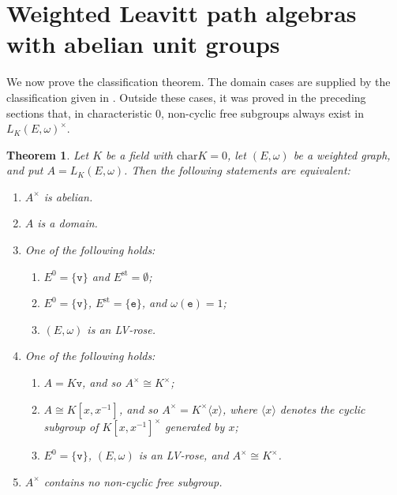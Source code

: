 \documentclass{article}
\newtheorem{theorem}{Theorem}
\theoremstyle{definition}
\begin{document}
\section{Weighted Leavitt path algebras with abelian unit groups}

We now prove the classification theorem. The domain cases are supplied by the classification given in \cite{HaP}. Outside these cases, it was proved in the preceding sections that, in characteristic $0$, non-cyclic free subgroups always exist in $L_K(E,\omega)^\times$.

\begin{theorem}\label{thm:abelian-units-and-free-subgroups}
Let $K$ be a field with $\mathrm{char} K =0 $, let $(E,\omega)$ be a weighted graph,
and put $A=L_K(E,\omega)$. Then the following statements are equivalent:
\begin{enumerate}[label=\textup{(\arabic*)}]
\item $A^\times$ is abelian.
\item $A$ is a domain.
\item One of the following holds:
\begin{enumerate}[label=\textup{(\alph*)}]
\item $E^0=\{\mathtt{v}\}$ and $E^{\mathrm{st}}=\emptyset$;
\item $E^0=\{\mathtt{v}\}$, $E^{\mathrm{st}}=\{\mathtt{e}\}$, and
$\omega(\mathtt{e})=1$;
\item $(E,\omega)$ is an LV-rose.
\end{enumerate}
\item One of the following holds:
\begin{enumerate}[label=\textup{(\alph*)}]
\item $A=K\mathtt{v}$, and so $A^\times\cong K^\times$;
\item $A\cong K[x,x^{-1}]$, and so
$A^\times=K^\times\langle x\rangle$, where $\langle x\rangle$ denotes the cyclic subgroup of $K[x,x^{-1}]^\times$ generated by $x$;
\item $E^0=\{\mathtt{v}\}$, $(E,\omega)$ is an LV-rose, and
$A^\times\cong K^\times$.
\end{enumerate}
\item $A^\times$ contains no non-cyclic free subgroup.
\end{enumerate}
\end{theorem}
\end{document}
